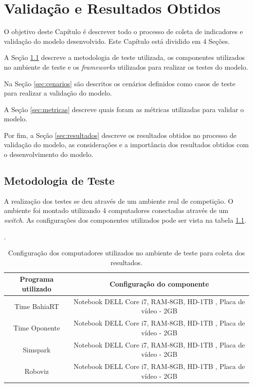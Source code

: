 \chapter{Validação e Resultados Obtidos}
\label{chap:resultados}
O objetivo deste Capítulo é descrever todo o processo de coleta de indicadores e validação do modelo desenvolvido. Este 
Capítulo está dividido em 4 Seções.

A Seção \ref{sec:metodologia} descreve a metodologia de teste utilizada, os componentes utilizados no 
ambiente de teste e os {\it frameworks} utilizados para realizar os testes do modelo.

Na Seção \ref{sec:cenarios} são descritos os cenários definidos como casos de teste para realizar a validação do modelo.

A Seção \ref{sec:metricas} descreve quais foram as métricas utilizadas para validar o modelo.

Por fim, a Seção \ref{sec:resultados} descreve os resultados obtidos no processo de validação do modelo, as considerações e 
a importância dos resultados obtidos com o desenvolvimento do modelo.

\section{Metodologia de Teste}
\label{sec:metodologia}
A realização dos testes se deu através de um ambiente real de competição. O ambiente foi montado utilizando 4 computadores
conectadas através de um {\it switch}. As configurações dos componentes utilizados pode ser vista na tabela \ref{tab:configambiente}.

\begin{table}[!htb]


\centering

\caption{Configuração dos computadores utilizados no ambiente de teste para coleta dos resultados.}.

  \begin{tabular}{|c|c|}

    \hline
    \hline
    Programa utilizado & Configuração do componente \\
    \hline
    \hline
    Time BahiaRT  & Notebook DELL Core i7, RAM-8GB, HD-1TB , Placa de vídeo - 2GB  \\
    \hline
    Time Oponente  & Notebook DELL Core i7, RAM-8GB, HD-1TB , Placa de vídeo - 2GB \\
    \hline
    Simspark  & Notebook DELL Core i7, RAM-8GB, HD-1TB , Placa de vídeo - 2GB \\
    \hline
    Roboviz & Notebook DELL Core i7, RAM-8GB, HD-1TB , Placa de vídeo - 2GB \\
    \hline
    \hline
  \end{tabular}

  \label{tab:configambiente}
\end{table}

